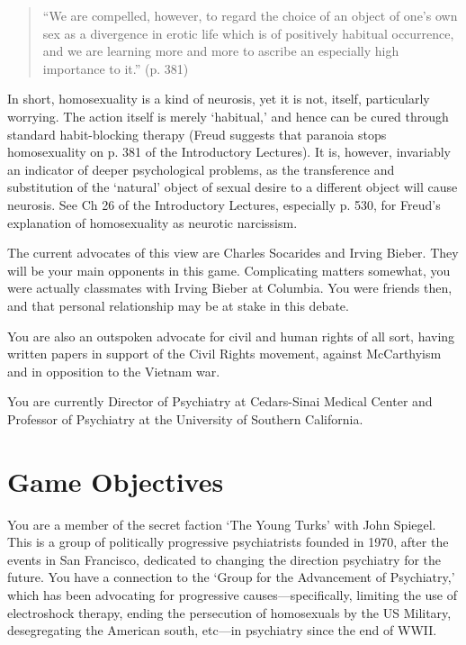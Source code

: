 \begin{quote}

``We are compelled, however, to regard the choice of an object of one's own sex as a divergence in erotic life which is of positively habitual occurrence, and we are learning more and more to ascribe an especially high importance to it.'' (p. 381)
\end{quote}

In short, homosexuality is a kind of neurosis, yet it is not, itself, particularly worrying. The action itself is merely `habitual,' and hence can be cured through standard habit-blocking therapy (Freud suggests that paranoia stops homosexuality on p. 381 of the Introductory Lectures). It is, however, invariably an indicator of deeper psychological problems, as the transference and substitution of the `natural' object of sexual desire to a different object will cause neurosis. See Ch 26 of the Introductory Lectures, especially p. 530, for Freud's explanation of homosexuality as neurotic narcissism.

The current advocates of this view are Charles Socarides and Irving Bieber. They will be your main opponents in this game. Complicating matters somewhat, you were actually classmates with Irving Bieber at Columbia. You were friends then, and that personal relationship may be at stake in this debate.

You are also an outspoken advocate for civil and human rights of all sort, having written papers in support of the Civil Rights movement, against McCarthyism and in opposition to the Vietnam war.

You are currently Director of Psychiatry at Cedars-Sinai Medical Center and Professor of Psychiatry at the University of Southern California.

\section{Game Objectives}
\label{gameobjectives}

You are a member of the secret faction `The Young Turks' with John Spiegel. This is a group of politically progressive psychiatrists founded in 1970, after the events in San Francisco, dedicated to changing the direction psychiatry for the future. You have a connection to the `Group for the Advancement of Psychiatry,' which has been advocating for progressive causes---specifically, limiting the use of electroshock therapy, ending the persecution of homosexuals by the US Military, desegregating the American south, etc---in psychiatry since the end of WWII. 

